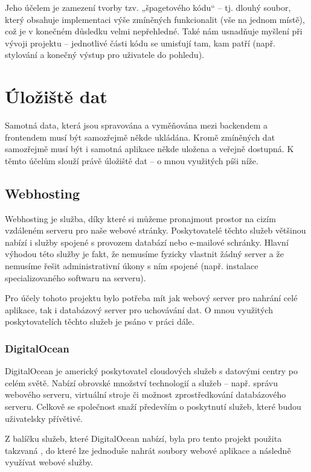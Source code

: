 		Jeho účelem je zamezení tvorby tzv. „špagetového kódu“ – tj. dlouhý soubor, který obsahuje implementaci výše zmíněných funkcionalit (vše na jednom místě), což je v konečném důsledku velmi nepřehledné. Také nám usnadňuje myšlení při vývoji projektu – jednotlivé části kódu se umisťují tam, kam patří (např. stylování a konečný výstup pro uživatele do pohledu). \cite{MVC}
		
\section{Úložiště dat}
Samotná data, která jsou spravována a vyměňována mezi backendem a frontendem musí být samozřejmě někde ukládána. Kromě zmíněných dat samozřejmě musí být i samotná aplikace někde uložena a veřejně dostupná. K těmto účelům slouží právě úložiště dat – o mnou využitých píši níže.

	\subsection{Webhosting}
	Webhosting je služba, díky které si můžeme pronajmout prostor na cizím vzdáleném serveru pro naše webové stránky. Poskytovatelé těchto služeb většinou nabízí i služby spojené s provozem databází nebo e-mailové schránky. Hlavní výhodou této služby je fakt, že nemusíme fyzicky vlastnit žádný server a že nemusíme řešit administrativní úkony s ním spojené (např. instalace specializovaného softwaru na serveru). \cite{Webhosting}
	
	Pro účely tohoto projektu bylo potřeba mít jak webový server pro nahrání celé aplikace, tak i databázový server pro uchovávání dat. O mnou využitých poskytovatelích těchto služeb je psáno v práci dále. 
	
		\subsubsection{DigitalOcean}
		DigitalOcean je americký poskytovatel cloudových služeb s datovými centry po celém světě. Nabízí obrovské množství technologií a služeb – např. správu webového serveru, virtuální stroje či možnost zprostředkování databázového serveru. Celkově se společnost snaží především o poskytnutí služeb, které budou uživatelsky přívětivé. \cite{DO1} \cite{DO2}
		
		Z balíčku služeb, které DigitalOcean nabízí, byla pro tento projekt použita takzvaná  \cite{DO3}, do které lze jednoduše nahrát soubory webové aplikace a následně využívat webové služby.
		
